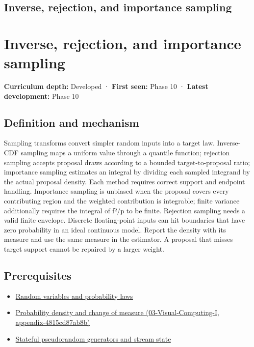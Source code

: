 \hypertarget{appendix-8d863ed954d0}{}
\section*{Inverse, rejection, and importance sampling}
\chapter{Inverse, rejection, and importance sampling}\label{appendix-8d863ed954d0-inverse-rejection-and-importance-sampling}

\textbf{Curriculum depth:} Developed · \textbf{First seen:} Phase 10 · \textbf{Latest development:} Phase 10

\section{Definition and mechanism}\label{appendix-8d863ed954d0-definition-and-mechanism}

Sampling transforms convert simpler random inputs into a target law. Inverse-CDF sampling maps a uniform value through a quantile function; rejection sampling accepts proposal draws according to a bounded target-to-proposal ratio; importance sampling estimates an integral by dividing each sampled integrand by the actual proposal density. Each method requires correct support and endpoint handling. Importance sampling is unbiased when the proposal covers every contributing region and the weighted contribution is integrable; finite variance additionally requires the integral of f²/p to be finite. Rejection sampling needs a valid finite envelope. Discrete floating-point inputs can hit boundaries that have zero probability in an ideal continuous model. Report the density with its measure and use the same measure in the estimator. A proposal that misses target support cannot be repaired by a larger weight.

\section{Prerequisites}\label{appendix-8d863ed954d0-prerequisites}

\begin{itemize}
\tightlist
\item
  \hyperref[appendix-4d0203f7944f]{Random variables and probability laws}
\item
  \href{../03-Visual-Computing-I/main.pdf\#nameddest=appendix-4815cd87ab8b}{Probability density and change of measure (03-Visual-Computing-I, appendix-4815cd87ab8b)}
\item
  \hyperref[appendix-e0f7c7e08f3a]{Stateful pseudorandom generators and stream state}
\end{itemize}

